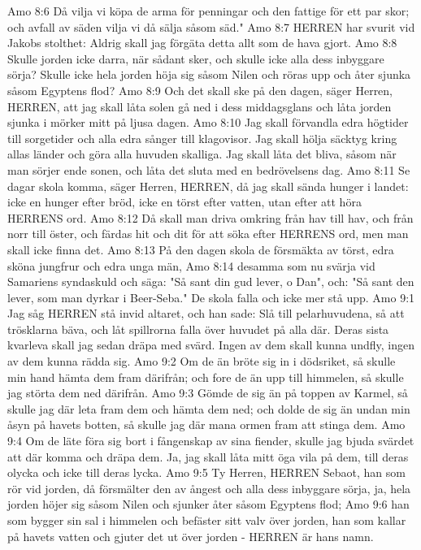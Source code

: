 Amo 8:6  Då vilja vi köpa de arma för penningar och den fattige för ett par skor; och avfall av säden vilja vi då sälja såsom säd."
Amo 8:7  HERREN har svurit vid Jakobs stolthet: Aldrig skall jag förgäta detta allt som de hava gjort.
Amo 8:8  Skulle jorden icke darra, när sådant sker, och skulle icke alla dess inbyggare sörja? Skulle icke hela jorden höja sig såsom Nilen och röras upp och åter sjunka såsom Egyptens flod?
Amo 8:9  Och det skall ske på den dagen, säger Herren, HERREN, att jag skall låta solen gå ned i dess middagsglans och låta jorden sjunka i mörker mitt på ljusa dagen.
Amo 8:10  Jag skall förvandla edra högtider till sorgetider och alla edra sånger till klagovisor. Jag skall hölja säcktyg kring allas länder och göra alla huvuden skalliga. Jag skall låta det bliva, såsom när man sörjer ende sonen, och låta det sluta med en bedrövelsens dag.
Amo 8:11  Se dagar skola komma, säger Herren, HERREN, då jag skall sända hunger i landet: icke en hunger efter bröd, icke en törst efter vatten, utan efter att höra HERRENS ord.
Amo 8:12  Då skall man driva omkring från hav till hav, och från norr till öster, och färdas hit och dit för att söka efter HERRENS ord, men man skall icke finna det.
Amo 8:13  På den dagen skola de försmäkta av törst, edra sköna jungfrur och edra unga män,
Amo 8:14  desamma som nu svärja vid Samariens syndaskuld och säga: "Så sant din gud lever, o Dan", och: "Så sant den lever, som man dyrkar i Beer-Seba." De skola falla och icke mer stå upp.
Amo 9:1  Jag såg HERREN stå invid altaret, och han sade: Slå till pelarhuvudena, så att trösklarna bäva, och låt spillrorna falla över huvudet på alla där. Deras sista kvarleva skall jag sedan dräpa med svärd. Ingen av dem skall kunna undfly, ingen av dem kunna rädda sig.
Amo 9:2  Om de än bröte sig in i dödsriket, så skulle min hand hämta dem fram därifrån; och fore de än upp till himmelen, så skulle jag störta dem ned därifrån.
Amo 9:3  Gömde de sig än på toppen av Karmel, så skulle jag där leta fram dem och hämta dem ned; och dolde de sig än undan min åsyn på havets botten, så skulle jag där mana ormen fram att stinga dem.
Amo 9:4  Om de läte föra sig bort i fångenskap av sina fiender, skulle jag bjuda svärdet att där komma och dräpa dem. Ja, jag skall låta mitt öga vila på dem, till deras olycka och icke till deras lycka.
Amo 9:5  Ty Herren, HERREN Sebaot, han som rör vid jorden, då försmälter den av ångest och alla dess inbyggare sörja, ja, hela jorden höjer sig såsom Nilen och sjunker åter såsom Egyptens flod;
Amo 9:6  han som bygger sin sal i himmelen och befäster sitt valv över jorden, han som kallar på havets vatten och gjuter det ut över jorden - HERREN är hans namn.
